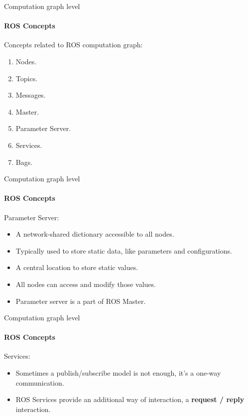 \documentclass{beamer}
\begin{document}
\begin{frame}{Computation graph level}
    \framesubtitle{ROS Concepts}
    
    Concepts related to ROS computation graph:
    
    \begin{enumerate}
        \item \textcolor{black!40}{Nodes.}
        \item \textcolor{black!40}{Topics.}
        \item \textcolor{black!40}{Messages.}
        \item \textcolor{black!40}{Master.}
        \item Parameter Server.
        \item Services.
        \item Bags.
    \end{enumerate}
\end{frame}

\begin{frame}{Computation graph level}
    \framesubtitle{ROS Concepts}
    {\huge Parameter Server:}
    \vspace{0.2cm}
    \begin{itemize}
        \item A network-shared dictionary accessible to all nodes.
        \item Typically used to store static data, like parameters and configurations.
        \item A central location to store static values.
        \item  All nodes can access and modify those values.
        \item Parameter server is a part of ROS Master.
    \end{itemize}  
\end{frame}

\begin{frame}{Computation graph level}
    \framesubtitle{ROS Concepts}
    {\huge Services:}
    \vspace{0.2cm}
    \begin{itemize}
        \item Sometimes a publish/subscribe model is not enough, it’s a one-way
        communication.
        \item ROS Services provide an additional way of interaction, a  \textbf{request / reply}
        interaction.
    \end{itemize}  
\end{frame}
\end{document}
